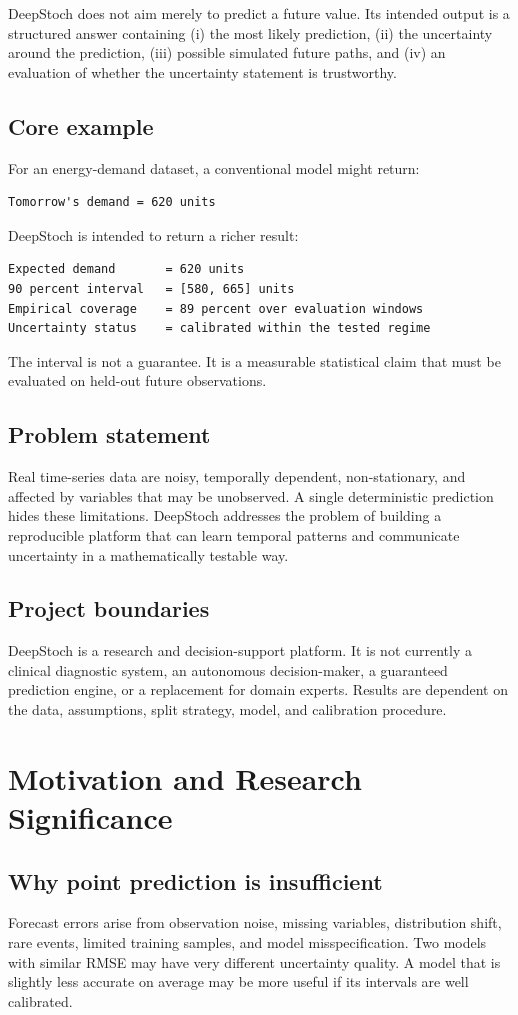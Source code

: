 \documentclass[11pt,a4paper]{report}
\begin{document}
DeepStoch does not aim merely to predict a future value. Its intended output is a structured answer containing (i) the most likely prediction, (ii) the uncertainty around the prediction, (iii) possible simulated future paths, and (iv) an evaluation of whether the uncertainty statement is trustworthy.

\section{Core example}
For an energy-demand dataset, a conventional model might return:
\begin{lstlisting}
Tomorrow's demand = 620 units
\end{lstlisting}
DeepStoch is intended to return a richer result:
\begin{lstlisting}
Expected demand       = 620 units
90 percent interval   = [580, 665] units
Empirical coverage    = 89 percent over evaluation windows
Uncertainty status    = calibrated within the tested regime
\end{lstlisting}
The interval is not a guarantee. It is a measurable statistical claim that must be evaluated on held-out future observations.

\section{Problem statement}
Real time-series data are noisy, temporally dependent, non-stationary, and affected by variables that may be unobserved. A single deterministic prediction hides these limitations. DeepStoch addresses the problem of building a reproducible platform that can learn temporal patterns and communicate uncertainty in a mathematically testable way.

\section{Project boundaries}
DeepStoch is a research and decision-support platform. It is not currently a clinical diagnostic system, an autonomous decision-maker, a guaranteed prediction engine, or a replacement for domain experts. Results are dependent on the data, assumptions, split strategy, model, and calibration procedure.

\chapter{Motivation and Research Significance}
\section{Why point prediction is insufficient}
Forecast errors arise from observation noise, missing variables, distribution shift, rare events, limited training samples, and model misspecification. Two models with similar RMSE may have very different uncertainty quality. A model that is slightly less accurate on average may be more useful if its intervals are well calibrated.
\end{document}
